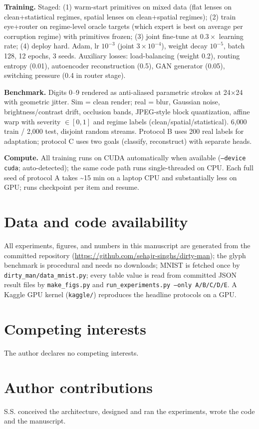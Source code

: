 \documentclass[11pt,a4paper]{article}
\begin{document}
\noindent\textbf{Training.} Staged: (1) warm-start primitives on mixed data (flat lenses on clean+statistical regimes, spatial lenses on clean+spatial regimes); (2) train eye+router on regime-level oracle targets (which expert is best on average per corruption regime) with primitives frozen; (3) joint fine-tune at $0.3\times$ learning rate; (4) deploy hard. Adam, lr $10^{-3}$ (joint $3\times10^{-4}$), weight decay $10^{-5}$, batch 128, 12 epochs, 3 seeds. Auxiliary losses: load-balancing (weight 0.2), routing entropy (0.01), autoencoder reconstruction (0.5), GAN generator (0.05), switching pressure (0.4 in router stage).

\noindent\textbf{Benchmark.} Digits 0--9 rendered as anti-aliased parametric strokes at 24$\times$24 with geometric jitter. Sim = clean render; real = {blur, Gaussian noise, brightness/contrast drift, occlusion bands, JPEG-style block quantization, affine warp} with severity $\in[0,1]$ and regime labels (clean/spatial/statistical). 6{,}000 train / 2{,}000 test, disjoint random streams. Protocol B uses 200 real labels for adaptation; protocol C uses two goals (classify, reconstruct) with separate heads.

\noindent\textbf{Compute.} All training runs on CUDA automatically when available (\texttt{--device cuda}; auto-detected); the same code path runs single-threaded on CPU. Each full seed of protocol A takes \textasciitilde15 min on a laptop CPU and substantially less on GPU; runs checkpoint per item and resume.

\section*{Data and code availability}
All experiments, figures, and numbers in this manuscript are generated from the committed repository (\url{https://github.com/sehajr-singhs/dirty-man}); the glyph benchmark is procedural and needs no downloads; MNIST is fetched once by \texttt{dirty\_man/data\_mnist.py}; every table value is read from committed JSON result files by \texttt{make\_figs.py} and \texttt{run\_experiments.py --only A/B/C/D/E}. A Kaggle GPU kernel (\texttt{kaggle/}) reproduces the headline protocols on a GPU.

\section*{Competing interests}
The author declares no competing interests.

\section*{Author contributions}
S.S. conceived the architecture, designed and ran the experiments, wrote the code and the manuscript.
\end{document}
